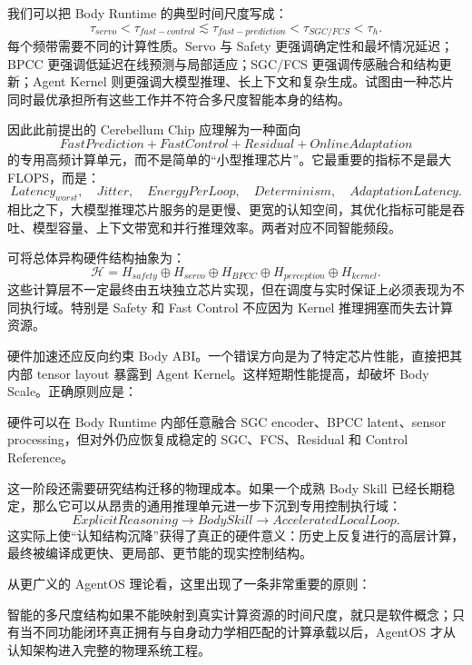 我们可以把 Body Runtime 的典型时间尺度写成：
\[
\tau_{servo}
<
\tau_{fast-control}
\lesssim
\tau_{fast-prediction}
<
\tau_{SGC/FCS}
<
\tau_h.
\]
每个频带需要不同的计算性质。Servo 与 Safety 更强调确定性和最坏情况延迟；BPCC 更强调低延迟在线预测与局部适应；SGC/FCS 更强调传感融合和结构更新；Agent Kernel 则更强调大模型推理、长上下文和复杂生成。试图由一种芯片同时最优承担所有这些工作并不符合多尺度智能本身的结构。

因此此前提出的 Cerebellum Chip 应理解为一种面向
\[
FastPrediction+
FastControl+
Residual+
OnlineAdaptation
\]
的专用高频计算单元，而不是简单的“小型推理芯片”。它最重要的指标不是最大 FLOPS，而是：
\[
Latency_{worst},
\quad
Jitter,
\quad
EnergyPerLoop,
\quad
Determinism,
\quad
AdaptationLatency.
\]
相比之下，大模型推理芯片服务的是更慢、更宽的认知空间，其优化指标可能是吞吐、模型容量、上下文带宽和并行推理效率。两者对应不同智能频段。

可将总体异构硬件结构抽象为：
\[
\mathcal H
=
H_{safety}
\oplus
H_{servo}
\oplus
H_{BPCC}
\oplus
H_{perception}
\oplus
H_{kernel}.
\]
这些计算层不一定最终由五块独立芯片实现，但在调度与实时保证上必须表现为不同执行域。特别是 Safety 和 Fast Control 不应因为 Kernel 推理拥塞而失去计算资源。

硬件加速还应反向约束 Body ABI。一个错误方向是为了特定芯片性能，直接把其内部 tensor layout 暴露到 Agent Kernel。这样短期性能提高，却破坏 Body Scale。正确原则应是：
\begin{statementbox}
\centering
{}
\end{statementbox}
硬件可以在 Body Runtime 内部任意融合 SGC encoder、BPCC latent、sensor processing，但对外仍应恢复成稳定的 SGC、FCS、Residual 和 Control Reference。

这一阶段还需要研究结构迁移的物理成本。如果一个成熟 Body Skill 已经长期稳定，那么它可以从昂贵的通用推理单元进一步下沉到专用控制执行域：
\[
ExplicitReasoning
\rightarrow
BodySkill
\rightarrow
AcceleratedLocalLoop.
\]
这实际上使“认知结构沉降”获得了真正的硬件意义：历史上反复进行的高层计算，最终被编译成更快、更局部、更节能的现实控制结构。

从更广义的 AgentOS 理论看，这里出现了一条非常重要的原则：
\begin{statementbox}
\centering
{}
\end{statementbox}
智能的多尺度结构如果不能映射到真实计算资源的时间尺度，就只是软件概念；只有当不同功能闭环真正拥有与自身动力学相匹配的计算承载以后，AgentOS 才从认知架构进入完整的物理系统工程。

